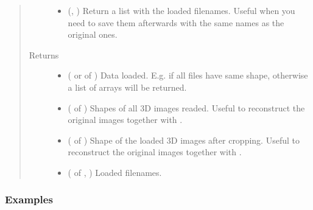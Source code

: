 \documentclass[letterpaper,10pt,english]{sphinxmanual}
\begin{document}
\begin{fulllineitems}
\begin{quote}
\begin{description}
\begin{itemize}
\item {} 
 (, ) \textendash{} Return a list with the loaded filenames. Useful when you need to save them afterwards with the same names as
the original ones.

\end{itemize}

\item[{Returns}] \leavevmode
\begin{itemize}
\item {} 
 ( or  of ) \textendash{} Data loaded. E.g.  if all files have same shape, otherwise a list of
 arrays will be returned.

\item {} 
 ( of ) \textendash{} Shapes of all 3D images readed. Useful to reconstruct the original images together with .

\item {} 
 ( of ) \textendash{} Shape of the loaded 3D images after cropping. Useful to reconstruct the original images together with
.

\item {} 
 ( of , ) \textendash{} Loaded filenames.

\end{itemize}


\end{description}\end{quote}
\subsubsection*{Examples}

\begin{sphinxVerbatim}[commandchars=\\\{\}]
  


\end{sphinxVerbatim}
\end{fulllineitems}
\end{document}
